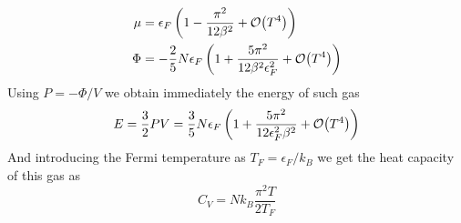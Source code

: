 \documentclass[../qm.tex]{subfiles}
\begin{document}
	\begin{equation}
		\begin{aligned}
			\mu&=\epsilon_F\left( 1-\frac{\pi^2}{12\beta^2}+\order{T^4} \right)\\
			\Phi&=-\frac{2}{5}N\epsilon_F\left( 1+\frac{5\pi^2}{12\beta^2\epsilon_F^2}+\order{T^4} \right)
		\end{aligned}
		\label{eq:approximatedsolution}
	\end{equation}
	Using $P=-\Phi/V$ we obtain immediately the energy of such gas
	\begin{equation}
		E=\frac{3}{2}PV=\frac{3}{5}N\epsilon_F\left( 1+\frac{5\pi^2}{12\epsilon_F^2\beta^2}+\order{T^4} \right)
		\label{eq:internalfermigas}
	\end{equation}
	And introducing the Fermi temperature as $T_F=\epsilon_F/k_B$ we get the heat capacity of this gas as
	\begin{equation}
		C_V=Nk_B\frac{\pi^2T}{2T_F}
		\label{eq:heatcapacityFermi}
	\end{equation}
\end{document}
